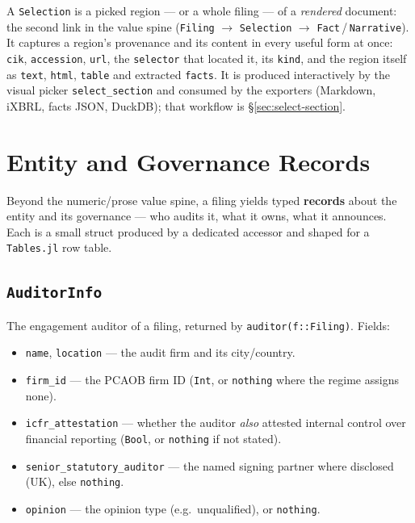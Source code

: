 \documentclass[11pt,a4paper]{report}
\begin{document}
\noindent A \texttt{Selection} is a picked region --- or a whole filing --- of a \emph{rendered} document:
the second link in the value spine (\texttt{Filing} $\rightarrow$ \texttt{Selection} $\rightarrow$
\texttt{Fact}\,/\,\texttt{Narrative}). It captures a region's provenance and its content in every useful form
at once: \texttt{cik}, \texttt{accession}, \texttt{url}, the \texttt{selector} that located it, its
\texttt{kind}, and the region itself as \texttt{text}, \texttt{html}, \texttt{table} and extracted
\texttt{facts}. It is produced interactively by the visual picker \texttt{select\_section} and consumed by
the exporters (Markdown, iXBRL, facts JSON, DuckDB); that workflow is \S\ref{sec:select-section}.

\section{Entity and Governance Records}
\label{sec:api-entity-records}

\noindent Beyond the numeric/prose value spine, a filing yields typed \textbf{records} about the entity and its
governance --- who audits it, what it owns, what it announces. Each is a small struct produced by a dedicated
accessor and shaped for a \texttt{Tables.jl} row table.

\subsection{\texttt{AuditorInfo}}
\label{sec:api-auditorinfo}

\noindent The engagement auditor of a filing, returned by \texttt{auditor(f::Filing)}. Fields:
\begin{itemize}[nosep]
  \item \texttt{name}, \texttt{location} --- the audit firm and its city/country.
  \item \texttt{firm\_id} --- the PCAOB firm ID (\texttt{Int}, or \texttt{nothing} where the regime assigns none).
  \item \texttt{icfr\_attestation} --- whether the auditor \emph{also} attested internal control over financial
    reporting (\texttt{Bool}, or \texttt{nothing} if not stated).
  \item \texttt{senior\_statutory\_auditor} --- the named signing partner where disclosed (UK), else
    \texttt{nothing}.
  \item \texttt{opinion} --- the opinion type (e.g.\ unqualified), or \texttt{nothing}.
\end{itemize}
\end{document}
